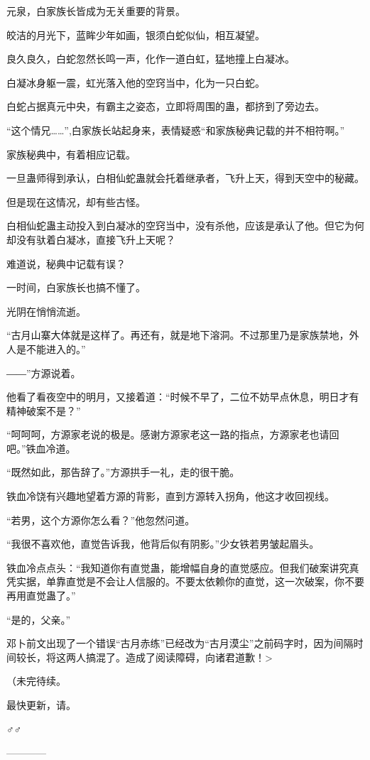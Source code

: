\begin{this_body}
元泉，白家族长皆成为无关重要的背景。

皎洁的月光下，蓝眸少年如画，银须白蛇似仙，相互凝望。

良久良久，白蛇忽然长鸣一声，化作一道白虹，猛地撞上白凝冰。

白凝冰身躯一震，虹光落入他的空窍当中，化为一只白蛇。

白蛇占据真元中央，有霸主之姿态，立即将周围的蛊，都挤到了旁边去。

“这个情兄……”,白家族长站起身来，表情疑惑“和家族秘典记载的并不相符啊。”

家族秘典中，有着相应记载。

一旦蛊师得到承认，白相仙蛇蛊就会托着继承者，飞升上天，得到天空中的秘藏。

但是现在这情况，却有些古怪。

白相仙蛇蛊主动投入到白凝冰的空窍当中，没有杀他，应该是承认了他。但它为何却没有驮着白凝冰，直接飞升上天呢？

难道说，秘典中记载有误？

一时间，白家族长也搞不懂了。

光阴在悄悄流逝。

“古月山寨大体就是这样了。再还有，就是地下溶洞。不过那里乃是家族禁地，外人是不能进入的。”

――”方源说着。

他看了看夜空中的明月，又接着道：“时候不早了，二位不妨早点休息，明日才有精神破案不是？”

“呵呵呵，方源家老说的极是。感谢方源家老这一路的指点，方源家老也请回吧。”铁血冷道。

“既然如此，那告辞了。”方源拱手一礼，走的很干脆。

铁血冷饶有兴趣地望着方源的背影，直到方源转入拐角，他这才收回视线。

“若男，这个方源你怎么看？”他忽然问道。

“我很不喜欢他，直觉告诉我，他背后似有阴影。”少女铁若男皱起眉头。

铁血冷点点头：“我知道你有直觉蛊，能增幅自身的直觉感应。但我们破案讲究真凭实据，单靠直觉是不会让人信服的。不要太依赖你的直觉，这一次破案，你不要再用直觉蛊了。”

“是的，父亲。”

邓卜前文出现了一个错误“古月赤练”已经改为“古月漠尘”之前码字时，因为间隔时间较长，将这两人搞混了。造成了阅读障碍，向诸君道歉！>

（未完待续。

最快更新，请。

♂♂

------------

\end{this_body}

